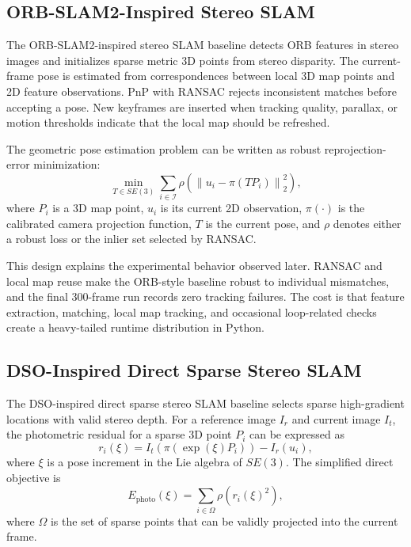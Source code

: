 \documentclass[11pt,a4paper]{article}
\newcommand{\methodorb}{ORB-SLAM2-inspired stereo SLAM}
\newcommand{\methoddso}{DSO-inspired direct sparse stereo SLAM}
\begin{document}
\subsection{ORB-SLAM2-Inspired Stereo SLAM}

The \methodorb{} baseline detects ORB features in stereo images and initializes sparse metric 3D points from stereo disparity. The current-frame pose is estimated from correspondences between local 3D map points and 2D feature observations. PnP with RANSAC rejects inconsistent matches before accepting a pose. New keyframes are inserted when tracking quality, parallax, or motion thresholds indicate that the local map should be refreshed.

The geometric pose estimation problem can be written as robust reprojection-error minimization:
\begin{equation}
  \min_{T\in SE(3)} \sum_{i\in\mathcal{I}} \rho\left(\left\|u_i - \pi(TP_i)\right\|_2^2\right),
\end{equation}
where $P_i$ is a 3D map point, $u_i$ is its current 2D observation, $\pi(\cdot)$ is the calibrated camera projection function, $T$ is the current pose, and $\rho$ denotes either a robust loss or the inlier set selected by RANSAC.

This design explains the experimental behavior observed later. RANSAC and local map reuse make the ORB-style baseline robust to individual mismatches, and the final 300-frame run records zero tracking failures. The cost is that feature extraction, matching, local map tracking, and occasional loop-related checks create a heavy-tailed runtime distribution in Python.

\subsection{DSO-Inspired Direct Sparse Stereo SLAM}

The \methoddso{} baseline selects sparse high-gradient locations with valid stereo depth. For a reference image $I_r$ and current image $I_t$, the photometric residual for a sparse 3D point $P_i$ can be expressed as
\begin{equation}
  r_i(\xi) = I_t\left(\pi(\exp(\xi)P_i)\right) - I_r(u_i),
\end{equation}
where $\xi$ is a pose increment in the Lie algebra of $SE(3)$. The simplified direct objective is
\begin{equation}
  E_{\mathrm{photo}}(\xi) = \sum_{i\in\Omega}\rho\left(r_i(\xi)^2\right),
\end{equation}
where $\Omega$ is the set of sparse points that can be validly projected into the current frame.
\end{document}
